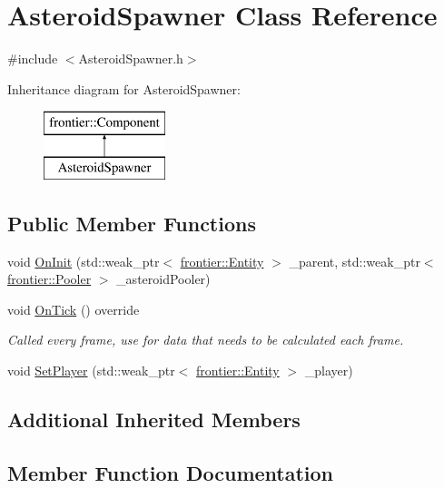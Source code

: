 \hypertarget{class_asteroid_spawner}{}\section{Asteroid\+Spawner Class Reference}
\label{class_asteroid_spawner}


{\ttfamily \#include $<$Asteroid\+Spawner.\+h$>$}

Inheritance diagram for Asteroid\+Spawner\+:\begin{figure}[H]
\begin{center}
\leavevmode
\includegraphics[height=2.000000cm]{class_asteroid_spawner}
\end{center}
\end{figure}
\subsection*{Public Member Functions}
\begin{DoxyCompactItemize}
\item 
void \hyperlink{class_asteroid_spawner_a55785f3beb7478604241becaacb266a3}{On\+Init} (std\+::weak\+\_\+ptr$<$ \hyperlink{classfrontier_1_1_entity}{frontier\+::\+Entity} $>$ \+\_\+parent, std\+::weak\+\_\+ptr$<$ \hyperlink{classfrontier_1_1_pooler}{frontier\+::\+Pooler} $>$ \+\_\+asteroid\+Pooler)
\item 
void \hyperlink{class_asteroid_spawner_acd2744a9a1ac8f13ac28220b33b9f750}{On\+Tick} () override
\begin{DoxyCompactList}\small\item\em Called every frame, use for data that needs to be calculated each frame. \end{DoxyCompactList}\item 
void \hyperlink{class_asteroid_spawner_a4ba8146f631d20b3f293f05cb6542da5}{Set\+Player} (std\+::weak\+\_\+ptr$<$ \hyperlink{classfrontier_1_1_entity}{frontier\+::\+Entity} $>$ \+\_\+player)
\end{DoxyCompactItemize}
\subsection*{Additional Inherited Members}


\subsection{Member Function Documentation}
\mbox{\label{class_asteroid_spawner_a55785f3beb7478604241becaacb266a3}} 
